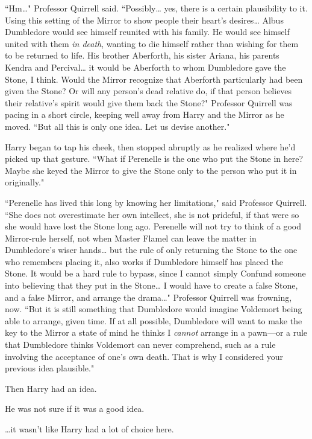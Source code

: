 ``Hm{\ldots}" Professor Quirrell said. ``Possibly{\ldots} yes, there is a certain plausibility to it. Using this setting of the Mirror to show people their heart's desires{\ldots} Albus Dumbledore would see himself reunited with his family. He would see himself united with them \emph{in death}, wanting to die himself rather than wishing for them to be returned to life. His brother Aberforth, his sister Ariana, his parents Kendra and Percival{\ldots} it would be Aberforth to whom Dumbledore gave the Stone, I think. Would the Mirror recognize that Aberforth particularly had been given the Stone? Or will any person's dead relative do, if that person believes their relative's spirit would give them back the Stone?" Professor Quirrell was pacing in a short circle, keeping well away from Harry and the Mirror as he moved. ``But all this is only one idea. Let us devise another."

Harry began to tap his cheek, then stopped abruptly as he realized where he'd picked up that gesture. ``What if Perenelle is the one who put the Stone in here? Maybe she keyed the Mirror to give the Stone only to the person who put it in originally."

``Perenelle has lived this long by knowing her limitations," said Professor Quirrell. ``She does not overestimate her own intellect, she is not prideful, if that were so she would have lost the Stone long ago. Perenelle will not try to think of a good Mirror-rule herself, not when Master Flamel can leave the matter in Dumbledore's wiser hands{\ldots} but the rule of only returning the Stone to the one who remembers placing it, also works if Dumbledore himself has placed the Stone. It would be a hard rule to bypass, since I cannot simply Confund someone into believing that they put in the Stone{\ldots} I would have to create a false Stone, and a false Mirror, and arrange the drama{\ldots}" Professor Quirrell was frowning, now. ``But it is still something that Dumbledore would imagine Voldemort being able to arrange, given time. If at all possible, Dumbledore will want to make the key to the Mirror a state of mind he thinks I \emph{cannot} arrange in a pawn---or a rule that Dumbledore thinks Voldemort can never comprehend, such as a rule involving the acceptance of one's own death. That is why I considered your previous idea plausible."

Then Harry had an idea.

He was not sure if it was a good idea.

{\ldots}it wasn't like Harry had a lot of choice here.

